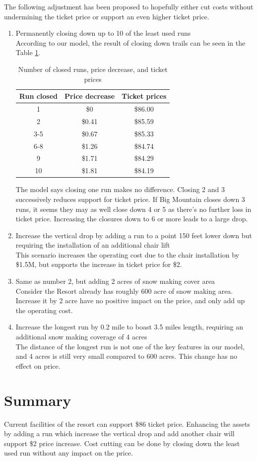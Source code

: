 \documentclass[14pt,a4paper]{extarticle}
\begin{document}
	The following adjustment has been proposed to hopefully either cut costs without undermining the ticket price or support an even higher ticket price.
	\begin{enumerate}
		\item Permanently closing down up to 10 of the least used runs \\[0.5cm]
		According to our model, the result of closing down trails can be seen in the Table \ref{table1}.
		\begin{table}
			\centering
			\renewcommand{\arraystretch}{1.2}
		\begin{tabular}{|c|c|c|}
			\hline
			Run closed & Price decrease & Ticket prices \\
			\hline
			1 & \$0 & \$86.00\\
			2 & \$0.41 & \$85.59\\
			3-5 & \$0.67 & \$85.33 \\
			6-8 & \$1.26 & \$84.74 \\
			9 & \$1.71 & \$84.29 \\
			10 & \$1.81 & \$84.19 \\
			\hline
		\end{tabular}
		\caption{Number of closed runs, price decrease, and ticket prices}
		\label{table1}
		\end{table}
		The model says closing one run makes no difference. Closing 2 and 3 successively reduces support for ticket price. If Big Mountain closes down 3 runs, it seems they may as well close down 4 or 5 as there's no further loss in ticket price. Increasing the closures down to 6 or more leads to a large drop.
		\item Increase the vertical drop by adding a run to a point 150 feet lower down but requiring the installation of an additional chair lift \\[0.5cm]
		This scenario increases the operating cost due to the chair installation by \$1.5M, but supports the increase in ticket price for \$2.
		\item Same as number 2, but adding 2 acres of snow making cover area\\[0.5cm]
		Consider the Resort already has roughly 600 acre of snow making area. Increase it by 2 acre have no positive impact on the price, and only add up the operating cost.
		\item Increase the longest run by 0.2 mile to boast 3.5 miles length, requiring an additional snow making coverage of 4 acres \\[0.5cm]
		The distance of the longest run is not one of the key features in our model, and 4 acres is still very small compared to 600 acres. This change has no effect on price.
	\end{enumerate}
	
	\section*{Summary}
		Current facilities of the resort can support \$86 ticket price. Enhancing the assets by adding a run which increase the vertical drop and add another chair will support \$2 price increase. Cost cutting can be done by closing down the least used run without any impact on the price.
\end{document}
